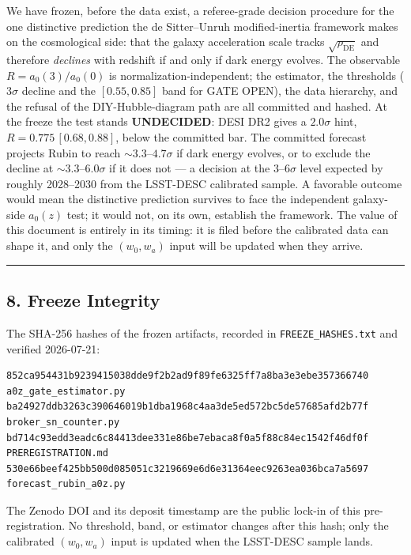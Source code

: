 \documentclass[
]{article}
\begin{document}
We have frozen, before the data exist, a referee-grade decision
procedure for the one distinctive prediction the de Sitter--Unruh
modified-inertia framework makes on the cosmological side: that the
galaxy acceleration scale tracks \(\sqrt{\rho_\mathrm{DE}}\) and therefore
\emph{declines} with redshift if and only if dark energy evolves. The
observable \(R=a_0(3)/a_0(0)\) is normalization-independent; the
estimator, the thresholds (\(3\sigma\) decline and the \([0.55,0.85]\)
band for GATE OPEN), the data hierarchy, and the refusal of the
DIY-Hubble-diagram path are all committed and hashed. At the freeze the
test stands \textbf{UNDECIDED}: DESI DR2 gives a \(2.0\sigma\) hint,
\(R=0.775\,[0.68,0.88]\), below the committed bar. The committed
forecast projects Rubin to reach \(\sim3.3\)--\(4.7\sigma\) if dark
energy evolves, or to exclude the decline at \(\sim3.3\)--\(6.0\sigma\)
if it does not --- a decision at the \(3\)--\(6\sigma\) level expected
by roughly 2028--2030 from the LSST-DESC calibrated sample. A favorable
outcome would mean the distinctive prediction survives to face the
independent galaxy-side \(a_0(z)\) test; it would not, on its own,
establish the framework. The value of this document is entirely in its
timing: it is filed before the calibrated data can shape it, and only
the \((w_0,w_a)\) input will be updated when they arrive.

\begin{center}\rule{0.5\linewidth}{0.5pt}\end{center}

\subsection{8. Freeze Integrity}\label{freeze-integrity}

The SHA-256 hashes of the frozen artifacts, recorded in
\texttt{FREEZE\_HASHES.txt} and verified 2026-07-21:

\begin{verbatim}
852ca954431b9239415038dde9f2b2ad9f89fe6325ff7a8ba3e3ebe357366740  a0z_gate_estimator.py
ba24927ddb3263c390646019b1dba1968c4aa3de5ed572bc5de57685afd2b77f  broker_sn_counter.py
bd714c93edd3eadc6c84413dee331e86be7ebaca8f0a5f88c84ec1542f46df0f  PREREGISTRATION.md
530e66beef425bb500d085051c3219669e6d6e31364eec9263ea036bca7a5697  forecast_rubin_a0z.py
\end{verbatim}

The Zenodo DOI and its deposit timestamp are the public lock-in of this
pre-registration. No threshold, band, or estimator changes after this
hash; only the calibrated \((w_0,w_a)\) input is updated when the
LSST-DESC sample lands.
\end{document}
